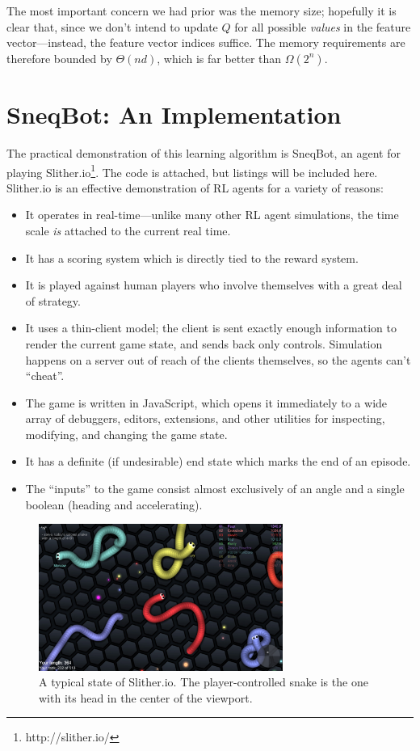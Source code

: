 \documentclass{article}
\begin{document}
	The most important concern we had prior was the memory size; hopefully it
	is clear that, since we don't intend to update $Q$ for all possible {\it
	values} in the feature vector---instead, the feature vector indices
	suffice. The memory requirements are therefore bounded by $\Theta(nd)$,
	which is far better than $\Omega(2^n)$.

\section{SneqBot: An Implementation}

	The practical demonstration of this learning algorithm is SneqBot, an agent
	for playing Slither.io\footnote{http://slither.io/}. The code is attached,
	but listings will be included here. Slither.io is an effective
	demonstration of RL agents for a variety of reasons:

	\begin{itemize}
		\item It operates in real-time---unlike many other RL agent
			simulations, the time scale {\it is} attached to the current real
			time.
		\item It has a scoring system which is directly tied to the reward
			system.
		\item It is played against human players who involve themselves with a
			great deal of strategy.
		\item It uses a thin-client model; the client is sent exactly enough
			information to render the current game state, and sends back only
			controls. Simulation happens on a server out of reach of the
			clients themselves, so the agents can't ``cheat''.
		\item The game is written in JavaScript, which opens it immediately to
			a wide array of debuggers, editors, extensions, and other utilities
			for inspecting, modifying, and changing the game state.
		\item It has a definite (if undesirable) end state which marks the end
			of an episode.
		\item The ``inputs'' to the game consist almost exclusively of an angle
			and a single boolean (heading and accelerating).
	\end{itemize}

	\begin{figure}[!b]
		\caption{A typical state of Slither.io. The player-controlled snake is the one with its head in the center of the viewport.}
		\centering
		\includegraphics[width=8cm]{slither_io.png}
	\end{figure}
\end{document}
